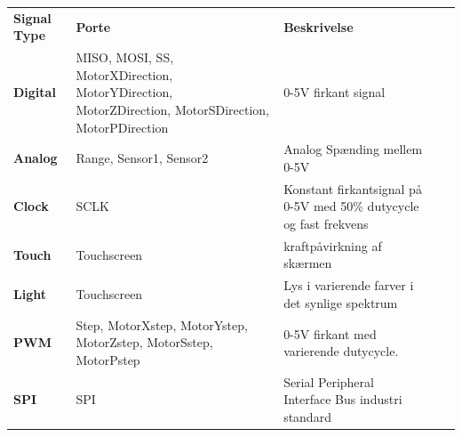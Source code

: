 \begin{tabularx}{360pt}{>{\bfseries}p{50pt}  TX TX}
	Signal Type & \textbf{Porte} & \textbf{Beskrivelse} \\
	Digital & MISO, MOSI, SS, MotorXDirection, MotorYDirection, MotorZDirection, MotorSDirection, MotorPDirection & 0-5V firkant signal \\
	Analog & Range, Sensor1, Sensor2 & Analog Spænding mellem 0-5V \\
	Clock & SCLK & Konstant firkantsignal på 0-5V med 50\% dutycycle og fast frekvens \\
	Touch & Touchscreen & kraftpåvirkning af skærmen \\
	Light & Touchscreen & Lys i varierende farver i det synlige spektrum \\
	PWM & Step, MotorXstep, MotorYstep, MotorZstep, MotorSstep, MotorPstep & 0-5V firkant med varierende dutycycle. \\
	SPI & SPI & Serial Peripheral Interface Bus industri standard \\
\end{tabularx}